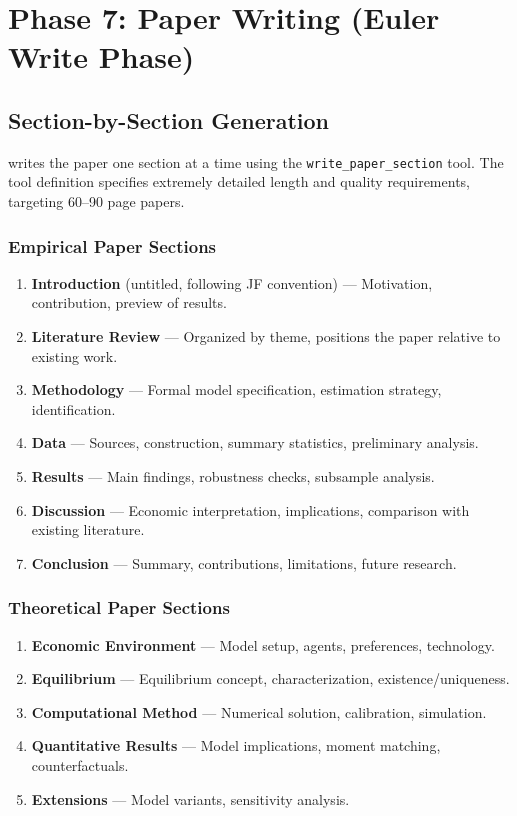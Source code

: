 \section{Phase 7: Paper Writing (Euler Write Phase)}
\label{sec:pipeline:writing}

\subsection{Section-by-Section Generation}

\euler writes the paper one section at a time using the \texttt{write\_paper\_section} tool.
The tool definition specifies extremely detailed length and quality requirements, targeting 60--90 page papers.

\subsubsection{Empirical Paper Sections}

\begin{enumerate}
  \item \textbf{Introduction} (untitled, following JF convention) --- Motivation, contribution, preview of results.
  \item \textbf{Literature Review} --- Organized by theme, positions the paper relative to existing work.
  \item \textbf{Methodology} --- Formal model specification, estimation strategy, identification.
  \item \textbf{Data} --- Sources, construction, summary statistics, preliminary analysis.
  \item \textbf{Results} --- Main findings, robustness checks, subsample analysis.
  \item \textbf{Discussion} --- Economic interpretation, implications, comparison with existing literature.
  \item \textbf{Conclusion} --- Summary, contributions, limitations, future research.
\end{enumerate}

\subsubsection{Theoretical Paper Sections}

\begin{enumerate}
  \item \textbf{Economic Environment} --- Model setup, agents, preferences, technology.
  \item \textbf{Equilibrium} --- Equilibrium concept, characterization, existence/uniqueness.
  \item \textbf{Computational Method} --- Numerical solution, calibration, simulation.
  \item \textbf{Quantitative Results} --- Model implications, moment matching, counterfactuals.
  \item \textbf{Extensions} --- Model variants, sensitivity analysis.
\end{enumerate}

